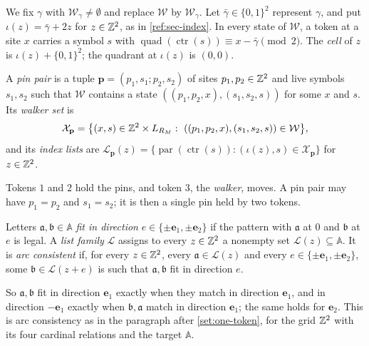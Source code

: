 We fix $\gamma$ with $\mathcal W_\gamma\ne\emptyset$ and replace $\mathcal W$ by $\mathcal W_\gamma$. Let $\bar\gamma\in\{0,1\}^2$ represent $\gamma$, and put $\iota(z)=\bar\gamma+2z$ for $z\in\mathbb{Z}^2$, as in \cref{ref:sec-index}. In every state of $\mathcal W$, a token at a site $x$ carries a symbol $s$ with $\operatorname{quad}(\operatorname{ctr}(s))\equiv x-\bar\gamma\pmod2$. The \emph{cell} of $z$ is $\iota(z)+\{0,1\}^2$; the quadrant at $\iota(z)$ is $(0,0)$.

\begin{definition}\label{thr:def-pins}
A \emph{pin pair} is a tuple $\mathbf p=(p_1,s_1;p_2,s_2)$ of sites $p_1,p_2\in\mathbb{Z}^2$ and live symbols $s_1,s_2$ such that $\mathcal W$ contains a state $((p_1,p_2,x),(s_1,s_2,s))$ for some $x$ and $s$. Its \emph{walker set} is
\[
\mathcal X_{\mathbf p}=\bigl\{(x,s)\in\Z^2\times L_{R_M}:\ ((p_1,p_2,x),(s_1,s_2,s))\in\mathcal W\bigr\},
\]
and its \emph{index lists} are $\mathcal L_{\mathbf p}(z)=\{\operatorname{par}(\operatorname{ctr}(s)):(\iota(z),s)\in\mathcal X_{\mathbf p}\}$ for $z\in\mathbb{Z}^2$.
\end{definition}

Tokens $1$ and $2$ hold the pins, and token $3$, the \emph{walker}, moves. A pin pair may have $p_1=p_2$ and $s_1=s_2$; it is then a single pin held by two tokens.

\begin{definition}\label{thr:def-lists}
Letters $\mathfrak a,\mathfrak b\in\mathbb A$ \emph{fit in direction} $e\in\{\pm\mathbf e_1,\pm\mathbf e_2\}$ if the pattern with $\mathfrak a$ at $0$ and $\mathfrak b$ at $e$ is legal. A \emph{list family} $\mathcal L$ assigns to every $z\in\mathbb{Z}^2$ a nonempty set $\mathcal L(z)\subseteq\mathbb A$. It is \emph{arc consistent} if, for every $z\in\mathbb{Z}^2$, every $\mathfrak a\in\mathcal L(z)$ and every $e\in\{\pm\mathbf e_1,\pm\mathbf e_2\}$, some $\mathfrak b\in\mathcal L(z+e)$ is such that $\mathfrak a,\mathfrak b$ fit in direction $e$.
\end{definition}

So $\mathfrak a,\mathfrak b$ fit in direction $\mathbf e_1$ exactly when they match in direction $\mathbf e_1$, and in direction $-\mathbf e_1$ exactly when $\mathfrak b,\mathfrak a$ match in direction $\mathbf e_1$; the same holds for $\mathbf e_2$. This is arc consistency as in the paragraph after \cref{set:one-token}, for the grid $\mathbb{Z}^2$ with its four cardinal relations and the target $\mathbb A$.

